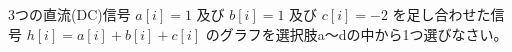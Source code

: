 3つの直流(DC)信号 $a[i] = 1$ 及び $b[i] = 1$ 及び $c[i] = -2$ を足し合わせた信号  $h[i] = a[i] + b[i] + c[i]$ のグラフを選択肢a〜dの中から1つ選びなさい。
